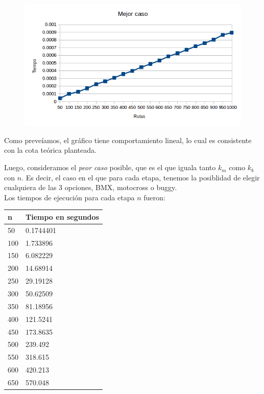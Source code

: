 \newpage
	
  \begin{figure}[h!]
   \begin{center}
 	\includegraphics[scale=0.8]{imagenes/ej1/mejorCaso.png}
   \end{center}
 \end{figure}
 
  Como preve\'iamos, el gr\'afico tiene comportamiento lineal, lo cual es consistente con la cota te\'orica planteada.
  
  Luego, consideramos el \emph{peor caso} posible, que es el que iguala tanto $k_m$ como $k_b$ con $n$.
  Es decir, el caso en el que para cada etapa, tenemos la posiblidad de elegir cualquiera de las 3 opciones, BMX, motocross o buggy.\\
  
  Los tiempos de ejecuci\'on para cada etapa $n$ fueron:
  
  \begin{table}[htb]
  \centering
  \begin{tabular}[c]{|l|l|}

		\hline
n & Tiempo en segundos\\
		\hline
50	&	0.1744401\\
		\hline
100	&	1.733896\\
		\hline
150	&	6.082229\\
		\hline
200	&	14.68914\\
		\hline
250	&	29.19128\\
		\hline
300	&	50.62509\\
		\hline
350	&	81.18956\\
		\hline
400	&	121.5241\\
		\hline
450	&	173.8635\\
		\hline
500	&	239.492\\
		\hline
550	&	318.615\\
		\hline
600	&	420.213\\
		\hline
650	&	570.048\\
		\hline

	\end{tabular}
	\end{table}
	
